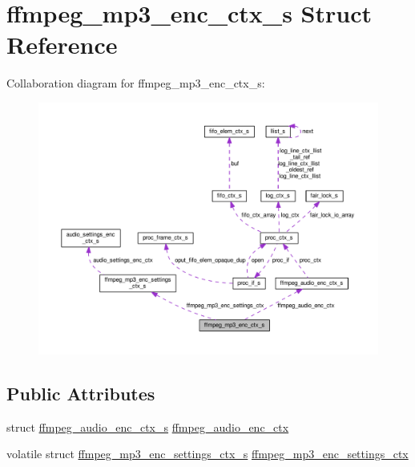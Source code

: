 \hypertarget{structffmpeg__mp3__enc__ctx__s}{}\section{ffmpeg\+\_\+mp3\+\_\+enc\+\_\+ctx\+\_\+s Struct Reference}
\label{structffmpeg__mp3__enc__ctx__s}


Collaboration diagram for ffmpeg\+\_\+mp3\+\_\+enc\+\_\+ctx\+\_\+s\+:\nopagebreak
\begin{figure}[H]
\begin{center}
\leavevmode
\includegraphics[width=350pt]{structffmpeg__mp3__enc__ctx__s__coll__graph}
\end{center}
\end{figure}
\subsection*{Public Attributes}
\begin{DoxyCompactItemize}
\item 
struct \hyperlink{structffmpeg__audio__enc__ctx__s}{ffmpeg\+\_\+audio\+\_\+enc\+\_\+ctx\+\_\+s} \hyperlink{structffmpeg__mp3__enc__ctx__s_aadcbc8d7f34dd0577f8f1a1414419d64}{ffmpeg\+\_\+audio\+\_\+enc\+\_\+ctx}
\item 
volatile struct \hyperlink{structffmpeg__mp3__enc__settings__ctx__s}{ffmpeg\+\_\+mp3\+\_\+enc\+\_\+settings\+\_\+ctx\+\_\+s} \hyperlink{structffmpeg__mp3__enc__ctx__s_ad1c00f0eb06b87b763f3a3f86d031a0b}{ffmpeg\+\_\+mp3\+\_\+enc\+\_\+settings\+\_\+ctx}
\end{DoxyCompactItemize}


